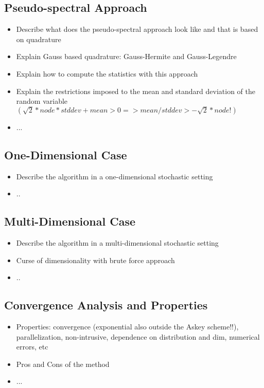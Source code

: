 \subsection{Pseudo-spectral Approach}
\label{subsec:Gaussian Quadrature}
\begin{itemize}
\item Describe what does the pseudo-spectral approach look like and that is based on quadrature
\item Explain Gauss based quadrature: Gauss-Hermite and Gauss-Legendre
\item Explain how to compute the statistics with this approach
\item Explain the restrictions imposed to the mean and standard deviation of the random variable $(\sqrt{2}*node*stddev + mean > 0 => mean/stddev > - \sqrt{2}*node!)$
\item ...
\end{itemize}	
\subsection{One-Dimensional Case}
\label{subsec:One-Dimensional Case}
\begin{itemize}
\item Describe the algorithm in a one-dimensional stochastic setting
\item ..
\end{itemize}	
\subsection{Multi-Dimensional Case}
\label{subsec:Multi-Dimensional Case}
\begin{itemize}
\item Describe the algorithm in a multi-dimensional stochastic setting
\item Curse of dimensionality with brute force approach
\item ..
\end{itemize}
\subsection{Convergence Analysis and Properties}
\label{subsec:Convergence Analysis and Properties}
\begin{itemize}
\item Properties: convergence (exponential also outside the Askey scheme!!), parallelization, non-intrusive, dependence on distribution and dim, numerical errors, etc
\item Pros and Cons of the method 
\item ...
\end{itemize}	
